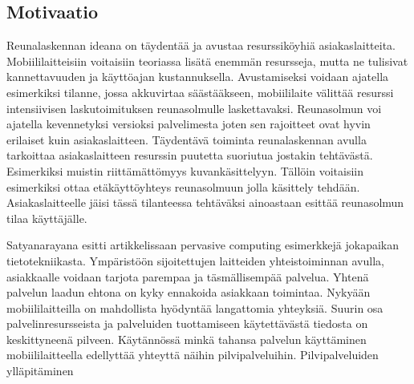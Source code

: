 \documentclass[finnish]{tktltiki2}
\theoremstyle{definition}
\theoremstyle{remark}
\begin{document}
\subsection{Motivaatio}
Reunalaskennan ideana on täydentää ja avustaa resurssiköyhiä asiakaslaitteita. Mobiililaitteisiin voitaisiin teoriassa lisätä enemmän resursseja, mutta ne tulisivat kannettavuuden ja käyttöajan kustannuksella. 
Avustamiseksi voidaan ajatella esimerkiksi tilanne, jossa akkuvirtaa säästääkseen, mobiililaite välittää resurssi intensiivisen laskutoimituksen reunasolmulle laskettavaksi. Reunasolmun voi ajatella kevennetyksi versioksi palvelimesta joten sen rajoitteet ovat hyvin erilaiset kuin asiakaslaitteen.
Täydentävä toiminta reunalaskennan avulla tarkoittaa asiakaslaitteen resurssin puutetta suoriutua jostakin tehtävästä. Esimerkiksi muistin riittämättömyys kuvankäsittelyyn. Tällöin voitaisiin esimerkiksi ottaa etäkäyttöyhteys reunasolmuun jolla käsittely tehdään. Asiakaslaitteelle jäisi tässä tilanteessa tehtäväksi ainoastaan esittää reunasolmun tilaa käyttäjälle.


Satyanarayana \cite{RefWorks:doc:5a65a2cee4b0cb152cfb50e7} esitti artikkelissaan pervasive computing esimerkkejä jokapaikan tietotekniikasta. Ympäristöön sijoitettujen laitteiden yhteistoiminnan avulla, asiakkaalle voidaan tarjota parempaa ja täsmällisempää palvelua. Yhtenä palvelun laadun ehtona on kyky ennakoida asiakkaan toimintaa.
Nykyään mobiililaitteilla on mahdollista hyödyntää langattomia yhteyksiä.
Suurin osa palvelinresursseista ja palveluiden tuottamiseen käytettävästä tiedosta  on keskittyneenä pilveen. Käytännössä minkä tahansa palvelun käyttäminen mobiililaitteella edellyttää yhteyttä näihin pilvipalveluihin. Pilvipalveluiden ylläpitäminen  
\end{document}
